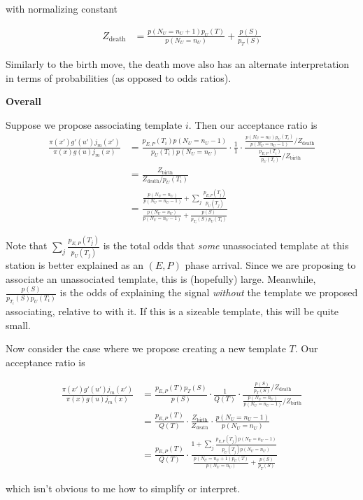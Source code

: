 \documentclass{article}
\begin{document}
with normalizing constant

\begin{align*}
Z_\text{death} &= \frac{p(N_U = n_U + 1)p_U(T)}{p(N_U = n_U)} + \frac{p(S)}{p_T(S)}
\end{align*}

Similarly to the birth move, the death move also has an alternate interpretation in terms of probabilities (as opposed to odds ratios). 

{\bf Overall}

Suppose we propose associating template $i$. Then our acceptance ratio is
\begin{align*}
\frac{\pi(x')g'(u')j_m(x')}{\pi(x)g(u)j_m(x)} &= \frac{p_{E,P}(T_i)p(N_U = n_U-1)}{p_U(T_i)p(N_U = n_U)} \cdot \frac{1}{1} \cdot \frac{\frac{p(N_U = n_U)p_U(T_i)}{p(N_U = n_U-1)} / Z_\text{death}}{\frac{p_{E, P}(T_i)}{p_U(T_i)} / Z_\text{birth}}\\
&= \frac{Z_\text{birth}}{Z_\text{death} / p_U(T_i)}\\
&=  \frac{\frac{p(N_U = n_U)}{p(N_U = n_U - 1)} + \sum_j  \frac{p_{E, P}(T_j)}{p_U(T_j)}}{\frac{p(N_U = n_U)}{p(N_U = n_U-1)} + \frac{p(S)}{p_{T_i}(S)p_U(T_i)}}
\end{align*}

Note that $\sum_j \frac{p_{E, P}(T_j)}{p_U(T_j)}$ is the total odds that {\em some} unassociated template at this station is better explained as an $(E, P)$ phase arrival. Since we are proposing to associate an unassociated template, this is (hopefully) large. Meanwhile, $\frac{p(S)}{p_{T_i}(S)p_U(T_i)}$ is the odds of explaining the signal {\em without} the template we proposed associating, relative to with it. If this is a sizeable template, this will be quite small. 

Now consider the case where we propose creating a new template $T$. Our acceptance ratio is 

\begin{align*}
\frac{\pi(x')g'(u')j_m(x')}{\pi(x)g(u)j_m(x)} &= \frac{p_{E,P}(T)p_{T}(S)}{p(S)} \cdot \frac{1}{Q(T)} \cdot \frac{\frac{p(S)}{p_{T}(S)} / Z_\text{death}}{\frac{p(N_U = n_U)}{p(N_U = n_U - 1)} / Z_\text{birth}}\\
&= \frac{p_{E,P}(T)}{Q(T)}  \cdot \frac{Z_\text{birth}}{Z_\text{death}}\cdot \frac{p(N_U = n_U -1)}{p(N_U = n_U)}\\
&= \frac{p_{E,P}(T)}{Q(T)}  \cdot \frac{1 + \sum_j  \frac{p_{E, P}(T_j)p(N_U = n_U-1)}{p_U(T_j)p(N_U = n_U)}}{\frac{p(N_U = n_U+1)p_U(T)}{p(N_U = n_U)} + \frac{p(S)}{p_{T}(S)}}
\end{align*}

which isn't obvious to me how to simplify or interpret.
\end{document}
